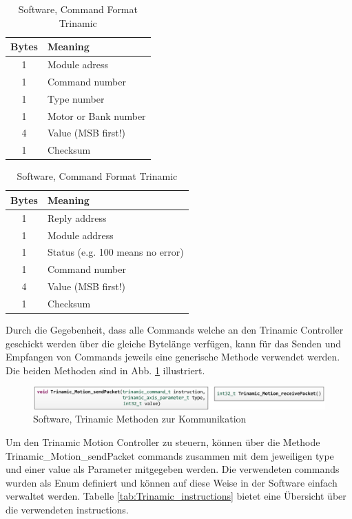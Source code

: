 \begin{table}[H]
	\centering 
	\begin{tabular}{|c|l|}
		\hline
		\textbf{Bytes} & \textbf{Meaning} \\
		\hline
		1     & Module adress \\
		\hline
		1     & Command number \\
		\hline
		1     & Type number \\
		\hline
		1     & Motor or Bank number \\
		\hline
		4     & Value (MSB first!) \\
		\hline
		1     & Checksum \\
		\hline
	\end{tabular}%
	\qquad 
	\begin{tabular}{|c|l|}
		\hline
		\textbf{Bytes} & \textbf{Meaning} \\
		\hline
		1     & Reply address \\
		\hline
		1     & Module address \\
		\hline
		1     & Status (e.g. 100 means no error) \\
		\hline
		1     & Command number \\
		\hline
		4     & Value (MSB first!) \\
		\hline
		1     & Checksum \\
		\hline
	\end{tabular}%
	\caption{Software, Command Format Trinamic \protect\cite{Trinamic}} 
	\label{tab:Trinamic_Command_Format} 
\end{table} 

Durch die Gegebenheit, dass alle Commands welche an den Trinamic Controller geschickt werden über die gleiche Bytelänge verfügen, kann für das Senden und Empfangen von Commands jeweils eine generische Methode verwendet werden. Die beiden Methoden sind in Abb. \ref{fig:Trinamic_Funktionen} illustriert.

\begin{figure}[H]
	\includegraphics[width=1\textwidth]{Illustrationen/6-Umsetzung/Trinamic_Funktionen.png}
	\caption{Software, Trinamic Methoden zur Kommunikation}
	\label{fig:Trinamic_Funktionen}
\end{figure}

Um den Trinamic Motion Controller zu steuern, können über die Methode Trinamic\_Motion\_sendPacket commands zusammen mit dem jeweiligen type und einer value als Parameter mitgegeben werden. Die verwendeten commands wurden als Enum definiert und können auf diese Weise in der Software einfach verwaltet werden. Tabelle \ref{tab:Trinamic_instructions} bietet eine Übersicht über die verwendeten instructions.

